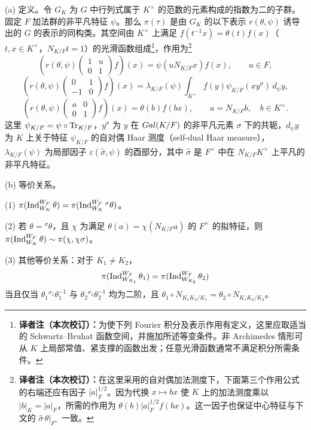 (a) 定义。令 $G_K$ 为 $G$ 中行列式属于 $K^\times$ 的范数的元素构成的指数为二的子群。固定 $F$ 加法群的非平凡特征 $\psi$。那么 $\pi(\tau)$ 是由 $G_K$ 的以下表示 $r(\theta,\psi)$ 诱导出的 $G$ 的表示的同构类。其空间由 $K^\times$ 上满足 $f(t^{-1}x)=\theta(t)f(x)$（$t,x\in K^\times$，$N_{K/F}t=1$）的光滑函数组成\footnote{\textbf{译者注（本次校订）：}为使下列 Fourier 积分及表示作用有定义，这里应取适当的 Schwartz--Bruhat 函数空间，并施加所述等变条件。非 Archimedes 情形可从 $K$ 上局部常值、紧支撑的函数出发；任意光滑函数通常不满足积分所需条件。}，作用为\footnote{\textbf{译者注（本次校订）：}在这里采用的自对偶加法测度下，下面第三个作用公式的右端还应有因子 $|a|_F^{1/2}$。因为代换 $x\mapsto bx$ 使 $K$ 上的加法测度乘以 $|b|_K=|a|_F$，所需的作用为 $\theta(b)|a|_F^{1/2}f(bx)$。这一因子也保证中心特征与下文的 $\widehat\sigma\,\theta|_{F^\times}$ 一致。}
\[
 \left(r(\theta,\psi)\begin{pmatrix}1&u\\0&1\end{pmatrix}f\right)(x)
 =\psi(uN_{K/F}x)f(x),\qquad u\in F,
\]
\[
 \left(r(\theta,\psi)\begin{pmatrix}0&1\\-1&0\end{pmatrix}f\right)(x)
 =\lambda_{K/F}(\psi)\int_{K^\times}f(y)\psi_{K/F}(xy^\sigma)\,d_\psi y,
\]
\[
 \left(r(\theta,\psi)\begin{pmatrix}a&0\\0&1\end{pmatrix}f\right)(x)
 =\theta(b)f(bx),\qquad a=N_{K/F}b,\quad b\in K^\times.
\]
这里 $\psi_{K/F}=\psi\circ\operatorname{Tr}_{K/F}$，$y^\sigma$ 为 $y$ 在 $Gal(K/F)$ 的非平凡元素 $\sigma$ 下的共轭，$d_\psi y$ 为 $K$ 上关于特征 $\psi_{K/F}$ 的自对偶 Haar 测度（self-dual Haar measure），$\lambda_{K/F}(\psi)$ 为局部因子 $\varepsilon(\widehat\sigma,\psi)$ 的酉部分，其中 $\widehat\sigma$ 是 $F^\times$ 中在 $N_{K/F}K^\times$ 上平凡的非平凡特征。

(b) 等价关系。

(1) $\pi(\operatorname{Ind}_{W_K}^{W_F}\theta)=\pi(\operatorname{Ind}_{W_K}^{W_F}{}^\sigma\theta)$。

(2) 若 $\theta={}^\sigma\theta$，且 $\chi$ 为满足 $\theta(a)=\chi(N_{K/F}a)$ 的 $F^\times$ 的拟特征，则 $\pi(\operatorname{Ind}_{W_K}^{W_F}\theta)\sim\pi(\chi,\chi\sigma)$。

(3) 其他等价关系：对于 $K_1\ne K_2$，
\[
 \pi(\operatorname{Ind}_{W_{K_1}}^{W_F}\theta_1)=\pi(\operatorname{Ind}_{W_{K_2}}^{W_F}\theta_2)
\]
当且仅当 $\theta_1{}^{\sigma_1}\theta_1^{-1}$ 与 $\theta_2{}^{\sigma_2}\theta_2^{-1}$ 均为二阶，且 $\theta_1\circ N_{K_1K_2/K_1}=\theta_2\circ N_{K_1K_2/K_2}$。

